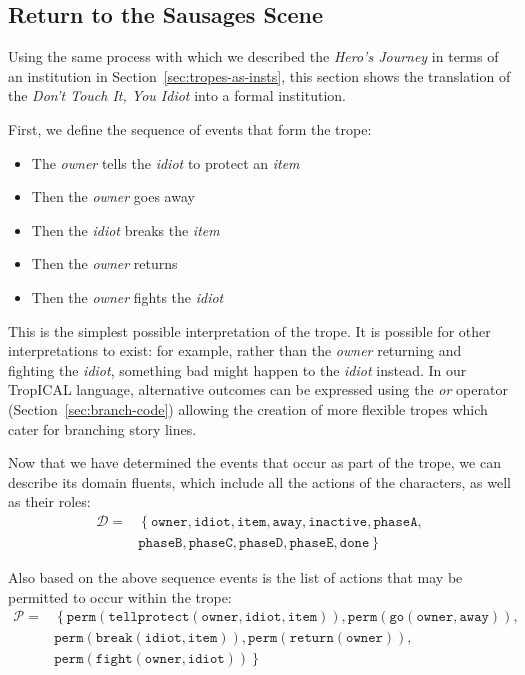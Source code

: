 \documentclass[11pt]{report}
\begin{document}
\subsection{Return to the Sausages Scene}

Using the same process with which we described the \emph{Hero's Journey} in
terms of an institution in Section~\ref{sec:tropes-as-insts}, this section shows
the translation of the \emph{Don't Touch It, You Idiot} into a formal institution.

First, we define the sequence of events that form the trope:

\begin{itemize}
\item The \emph{owner} tells the \emph{idiot} to protect an \emph{item}
\item Then the \emph{owner} goes away
\item Then the \emph{idiot} breaks the \emph{item}
\item Then the \emph{owner} returns
\item Then the \emph{owner} fights the \emph{idiot}
\end{itemize}

This is the simplest possible interpretation of the trope. It is possible for
other interpretations to exist: for example, rather than the \emph{owner} returning and
fighting the \emph{idiot}, something bad might happen to the \emph{idiot}
instead. In our TropICAL language, alternative outcomes can be expressed using
the \emph{or} operator (Section~\ref{sec:branch-code}) allowing the creation of more flexible tropes
which cater for branching story lines.

Now that we have determined the events that occur as part of the trope, we can describe its domain fluents, which include all the
actions of the characters, as well as their roles:
\begin{align*}
  \mathcal{D} =&\left\{\mathtt{owner, idiot, item, away, inactive, phaseA,}\right.\\\nonumber
  &\left. {} \mathtt{phaseB, phaseC, phaseD, phaseE, done}\right\} %
\end{align*}

Also based on the above sequence events is the list of actions that may be
permitted to occur within the trope:
\begin{align*}
  \mathcal{P} =& \left\{\mathtt{perm(tellprotect(owner, idiot, item)), perm(go(owner, away)),}\right.\nonumber\\
  &\left. {} \mathtt{perm(break(idiot, item)), perm(return(owner)),}\right.\nonumber\\
             &\left. {} \mathtt{perm(fight(owner, idiot))}\right\} %
\end{align*}
\end{document}
